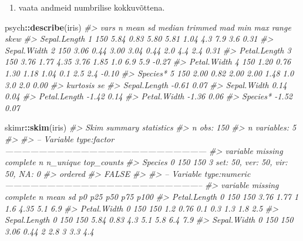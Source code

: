 \documentclass[]{book}
\newenvironment{Shaded}{\begin{snugshade}}{\end{snugshade}}
\newcommand{\CommentTok}[1]{\textcolor[rgb]{0.56,0.35,0.01}{\textit{#1}}}
\newcommand{\KeywordTok}[1]{\textcolor[rgb]{0.13,0.29,0.53}{\textbf{#1}}}
\newcommand{\NormalTok}[1]{#1}
\newcommand{\OperatorTok}[1]{\textcolor[rgb]{0.81,0.36,0.00}{\textbf{#1}}}
\providecommand{\tightlist}{%
  \setlength{\itemsep}{0pt}\setlength{\parskip}{0pt}}
\begin{document}
\begin{enumerate}
\def\labelenumi{\arabic{enumi}.}
\setcounter{enumi}{1}
\tightlist
\item
  vaata andmeid numbrilise kokkuvõttena.
\end{enumerate}

\begin{Shaded}
\begin{Highlighting}[]
\NormalTok{psych}\OperatorTok{::}\KeywordTok{describe}\NormalTok{(iris) }
\CommentTok{#>              vars   n mean   sd median trimmed  mad min max range  skew}
\CommentTok{#> Sepal.Length    1 150 5.84 0.83   5.80    5.81 1.04 4.3 7.9   3.6  0.31}
\CommentTok{#> Sepal.Width     2 150 3.06 0.44   3.00    3.04 0.44 2.0 4.4   2.4  0.31}
\CommentTok{#> Petal.Length    3 150 3.76 1.77   4.35    3.76 1.85 1.0 6.9   5.9 -0.27}
\CommentTok{#> Petal.Width     4 150 1.20 0.76   1.30    1.18 1.04 0.1 2.5   2.4 -0.10}
\CommentTok{#> Species*        5 150 2.00 0.82   2.00    2.00 1.48 1.0 3.0   2.0  0.00}
\CommentTok{#>              kurtosis   se}
\CommentTok{#> Sepal.Length    -0.61 0.07}
\CommentTok{#> Sepal.Width      0.14 0.04}
\CommentTok{#> Petal.Length    -1.42 0.14}
\CommentTok{#> Petal.Width     -1.36 0.06}
\CommentTok{#> Species*        -1.52 0.07}
\end{Highlighting}
\end{Shaded}

\begin{Shaded}
\begin{Highlighting}[]
\NormalTok{skimr}\OperatorTok{::}\KeywordTok{skim}\NormalTok{(iris) }
\CommentTok{#> Skim summary statistics}
\CommentTok{#>  n obs: 150 }
\CommentTok{#>  n variables: 5 }
\CommentTok{#> }
\CommentTok{#> -- Variable type:factor ------------------------------------------------------------------------}
\CommentTok{#>  variable missing complete   n n_unique                       top_counts}
\CommentTok{#>   Species       0      150 150        3 set: 50, ver: 50, vir: 50, NA: 0}
\CommentTok{#>  ordered}
\CommentTok{#>    FALSE}
\CommentTok{#> }
\CommentTok{#> -- Variable type:numeric -----------------------------------------------------------------------}
\CommentTok{#>      variable missing complete   n mean   sd  p0 p25  p50 p75 p100}
\CommentTok{#>  Petal.Length       0      150 150 3.76 1.77 1   1.6 4.35 5.1  6.9}
\CommentTok{#>   Petal.Width       0      150 150 1.2  0.76 0.1 0.3 1.3  1.8  2.5}
\CommentTok{#>  Sepal.Length       0      150 150 5.84 0.83 4.3 5.1 5.8  6.4  7.9}
\CommentTok{#>   Sepal.Width       0      150 150 3.06 0.44 2   2.8 3    3.3  4.4}
\end{Highlighting}
\end{Shaded}
\end{document}
